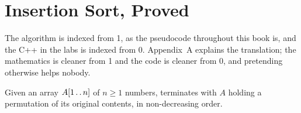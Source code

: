 \section{Insertion Sort, Proved}


The algorithm is indexed from 1, as the pseudocode throughout this book is, and
the C++ in the labs is indexed from 0. Appendix~A explains the translation; the
mathematics is cleaner from 1 and the code is cleaner from 0, and pretending
otherwise helps nobody.

\begin{theorem}\label{thm:insort}
Given an array $A[1 \mathinner{\ldotp\ldotp} n]$ of $n \ge 1$ numbers,
 terminates with $A$ holding a permutation of its
original contents, in non-decreasing order.
\end{theorem}

